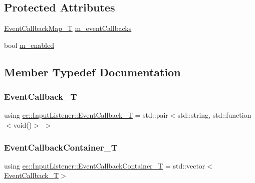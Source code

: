 \subsection*{Protected Attributes}
\begin{DoxyCompactItemize}
\item 
\mbox{\hyperlink{classec_1_1_input_listener_a13553604a5ae8c32fa95d304206aa01a}{Event\+Callback\+Map\+\_\+T}} \mbox{\hyperlink{classec_1_1_input_listener_aa1268f07d01b2ef31148ef1dba72951b}{m\+\_\+event\+Callbacks}}
\item 
bool \mbox{\hyperlink{classec_1_1_input_listener_af36b5fc46ed59886d73b1613aaef5a47}{m\+\_\+enabled}}
\end{DoxyCompactItemize}


\subsection{Member Typedef Documentation}
\mbox{\label{classec_1_1_input_listener_a6d62bd83a0cb80c979711d26722c8c6d}} 
\subsubsection{\texorpdfstring{Event\+Callback\+\_\+T}{EventCallback\_T}}
{\footnotesize\ttfamily using \mbox{\hyperlink{classec_1_1_input_listener_a6d62bd83a0cb80c979711d26722c8c6d}{ec\+::\+Input\+Listener\+::\+Event\+Callback\+\_\+T}} =  std\+::pair$<$std\+::string, std\+::function$<$void()$>$ $>$}

\mbox{\label{classec_1_1_input_listener_a3bb7086fdca1d1a76428b1e737e9e002}} 
\subsubsection{\texorpdfstring{Event\+Callback\+Container\+\_\+T}{EventCallbackContainer\_T}}
{\footnotesize\ttfamily using \mbox{\hyperlink{classec_1_1_input_listener_a3bb7086fdca1d1a76428b1e737e9e002}{ec\+::\+Input\+Listener\+::\+Event\+Callback\+Container\+\_\+T}} =  std\+::vector$<$\mbox{\hyperlink{classec_1_1_input_listener_a6d62bd83a0cb80c979711d26722c8c6d}{Event\+Callback\+\_\+T}}$>$}

